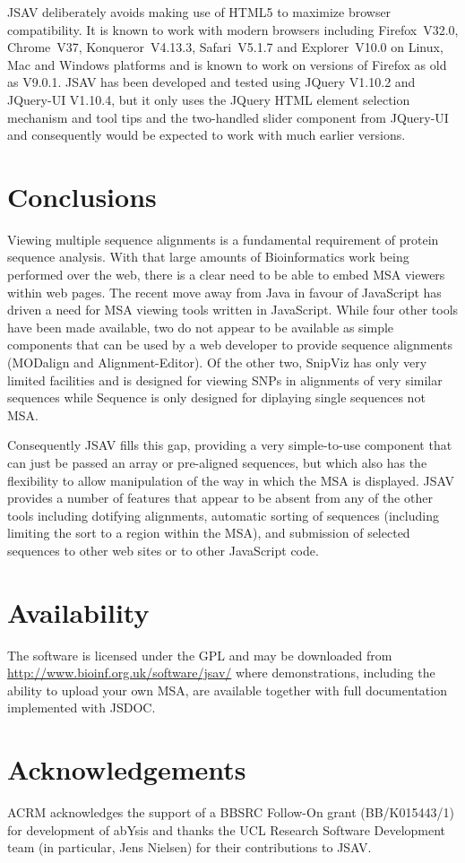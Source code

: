 \documentclass{article}
\begin{document}
JSAV deliberately avoids making use of HTML5 to maximize browser
compatibility. It is known to work with modern browsers including
Firefox~V32.0, Chrome~V37, Konqueror~V4.13.3, Safari~V5.1.7 and
Explorer~V10.0 on Linux, Mac and Windows platforms and is known to
work on versions of Firefox as old as V9.0.1. JSAV has been developed
and tested using JQuery V1.10.2 and JQuery-UI V1.10.4, but it only
uses the JQuery HTML element selection mechanism and tool tips and the
two-handled slider component from JQuery-UI and consequently would be
expected to work with much earlier versions.

\section{Conclusions}
Viewing multiple sequence alignments is a fundamental requirement of
protein sequence analysis. With that large amounts of Bioinformatics
work being performed over the web, there is a clear need to be able to
embed MSA viewers within web pages. The recent move away from Java in
favour of JavaScript has driven a need for MSA viewing tools written
in JavaScript. While four other tools have been made available, two do
not appear to be available as simple components that can be used by a
web developer to provide sequence alignments (MODalign and
Alignment-Editor). Of the other two, SnipViz has only very limited
facilities and is designed for viewing SNPs in alignments of very
similar sequences while Sequence is only designed for diplaying single
sequences not MSA.

Consequently JSAV fills this gap, providing a very simple-to-use
component that can just be passed an array or pre-aligned sequences,
but which also has the flexibility to allow manipulation of the way in
which the MSA is displayed. JSAV provides a number of features that
appear to be absent from any of the other tools including dotifying
alignments, automatic sorting of sequences (including limiting the
sort to a region within the MSA), and submission of selected sequences
to other web sites or to other JavaScript code.


\section{Availability}
The software is licensed under the GPL and may be downloaded from
\url{http://www.bioinf.org.uk/software/jsav/} where demonstrations,
including the ability to upload your own MSA, are available together
with full documentation implemented with JSDOC.

\section{Acknowledgements}
ACRM acknowledges the support of a BBSRC Follow-On grant
(BB/K015443/1) for development of abYsis and thanks the UCL Research
Software Development team (in particular, Jens Nielsen) for their
contributions to JSAV.


\end{document}
